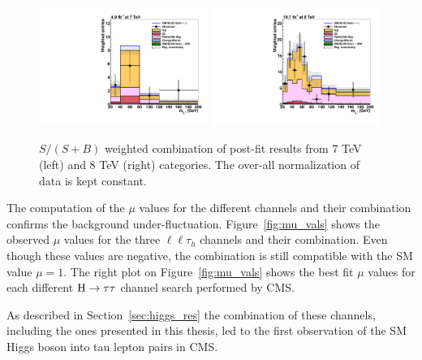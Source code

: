 \begin{figure}
\begin{center}
  \includegraphics[width=0.49\textwidth]{4_Analisys/pics/postfit/postfit_ssb_weight_7TeV.pdf}
  \includegraphics[width=0.49\textwidth]{4_Analisys/pics/postfit/postfit_ssb_weight_8TeV.pdf}\\
  \caption{$S / (S+B)$ weighted combination of post-fit results from 7 TeV (left) and 8 TeV (right) categories. The over-all normalization of data is kept constant.}
  \label{fig:sbweight}
\end{center}
\end{figure}

The computation of the $\mu$ values for the different channels and their combination confirms the background under-fluctuation. Figure~\ref{fig:mu_vals} shows the observed $\mu$ values for the three $\ell\ell\tau_h$ channels and their combination. Even though these values are negative, the combination is still compatible with the SM value $\mu = 1$. The right plot on Figure~\ref{fig:mu_vals} shows the best fit $\mu$ values for each different $\mathrm{H}\rightarrow\tau\tau$ channel search performed by CMS.%

As described in Section~\ref{sec:higgs_res} the combination of these channels, including the ones presented in this thesis, led to the first observation of the SM Higgs boson into tau lepton pairs in CMS.

